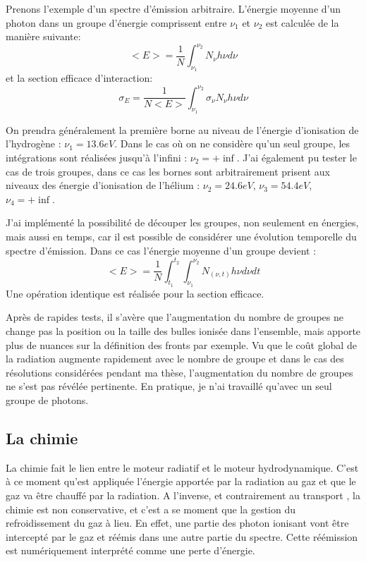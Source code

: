 Prenons l'exemple d'un spectre d'émission arbitraire.
L’énergie moyenne d'un photon dans un groupe d'énergie comprissent entre $\nu_1$ et $\nu_2$ est calculée de la manière suivante:
\begin{equation}
<E> = \frac{1}{N} \int_{\nu_1}^{\nu_2} N_\nu h \nu d\nu
\end{equation}
et la section efficace d'interaction:
\begin{equation}
\sigma_E = \frac{1}{N<E>} \int_{\nu_1}^{\nu_2} \sigma_\nu N_\nu h \nu d\nu
\end{equation}

On prendra généralement la première borne au niveau de l'énergie d'ionisation de l'hydrogène : $\nu_1=13.6eV$.
Dans le cas où on ne considère qu'un seul groupe, les intégrations sont réalisées jusqu'à l'infini : $\nu_2= + \inf$.
J'ai également pu tester le cas de trois groupes, dans ce cas les bornes sont arbitrairement prisent aux niveaux des énergie d'ionisation de l'hélium : 
$\nu_2= 24.6 eV$, $\nu_3= 54.4 eV $, $\nu_4= + \inf$.

J'ai implémenté la possibilité de découper les groupes, non seulement en énergies, mais aussi en temps, car il est possible de considérer une évolution temporelle du spectre d'émission.
Dans ce cas l'énergie moyenne d'un groupe devient : 
\begin{equation}
<E> = \frac{1}{N}  \int_{t_1}^{t_2}  \int_{\nu_1}^{\nu_2} N_{(\nu,t)} h \nu d\nu dt
\end{equation}
Une opération identique est réalisée pour la section efficace.

Après de rapides tests, il s'avère que l'augmentation du nombre de groupes ne change pas la position ou la taille des bulles ionisée dans l'ensemble, mais apporte plus de nuances sur la définition des fronts par exemple.
Vu que le coût global de la radiation augmente rapidement avec le nombre de groupe et dans le cas des résolutions considérées pendant ma thèse, l'augmentation du nombre de groupes ne s'est pas révélée pertinente.
En pratique, je n'ai travaillé qu'avec un seul groupe de photons.

\subsection{La chimie}
\label{sec:chimie}

La chimie fait le lien entre le moteur radiatif et le moteur hydrodynamique.
C'est à ce moment qu'est appliquée l'énergie apportée par la radiation au gaz et que le gaz va être chauffé par la radiation.
A l'inverse, et contrairement au transport , la chimie est non conservative, et c'est a se moment que la gestion du refroidissement du gaz à lieu.
En effet, une partie des photon ionisant vont être intercepté par le gaz et réémis dans une autre partie du spectre.
Cette réémission est numériquement interprété comme une perte d'énergie.


